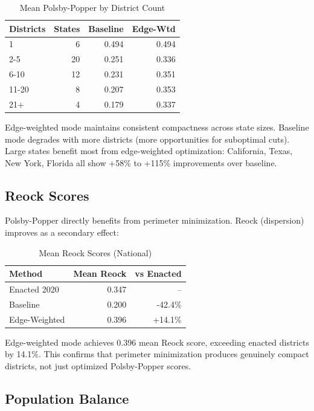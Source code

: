 \begin{table}[h]
\centering
\caption{Mean Polsby-Popper by District Count}
\begin{tabular}{lrrr}
\toprule
\textbf{Districts} & \textbf{States} & \textbf{Baseline} & \textbf{Edge-Wtd} \\
\midrule
1 & 6 & 0.494 & 0.494 \\
2-5 & 20 & 0.251 & 0.336 \\
6-10 & 12 & 0.231 & 0.351 \\
11-20 & 8 & 0.207 & 0.353 \\
21+ & 4 & 0.179 & 0.337 \\
\bottomrule
\end{tabular}
\end{table}

Edge-weighted mode maintains consistent compactness across state sizes. Baseline mode degrades with more districts (more opportunities for suboptimal cuts). Large states benefit most from edge-weighted optimization: California, Texas, New York, Florida all show +58\% to +115\% improvements over baseline.

\subsection{Reock Scores}

Polsby-Popper directly benefits from perimeter minimization. Reock (dispersion) improves as a secondary effect:

\begin{table}[h]
\centering
\caption{Mean Reock Scores (National)}
\begin{tabular}{lrr}
\toprule
\textbf{Method} & \textbf{Mean Reock} & \textbf{vs Enacted} \\
\midrule
Enacted 2020 & 0.347 & -- \\
Baseline & 0.200 & -42.4\% \\
Edge-Weighted & 0.396 & +14.1\% \\
\bottomrule
\end{tabular}
\end{table}

Edge-weighted mode achieves 0.396 mean Reock score, exceeding enacted districts by 14.1\%. This confirms that perimeter minimization produces genuinely compact districts, not just optimized Polsby-Popper scores.

\subsection{Population Balance}

